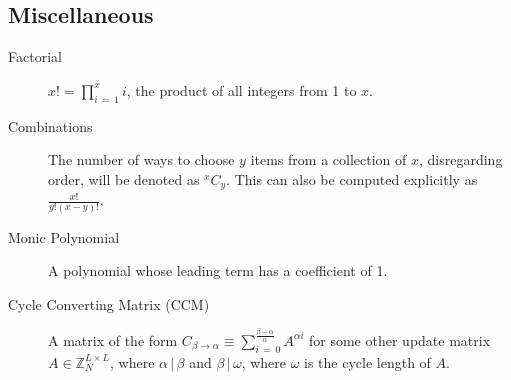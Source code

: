 \documentclass[a4paper, reqno, 12pt]{amsart}
\newcommand\combine[2]{{}^{#1}C_{#2}}
\begin{document}
		\subsection{Miscellaneous}
			\begin{description}
				\item[Factorial] $x! = \prod_{i \, = \, 1}^{x} i$, the product of all integers from 1 to $x$.
			
				\item[Combinations] The number of ways to choose $y$ items from a collection of $x$, disregarding order, will be denoted as $\combine{x}{y}$. This can also
				be computed explicitly as $\frac{x!}{y!(x-y)!}$.
				
				\item[Monic Polynomial] A polynomial whose leading term has a coefficient of 1.
				
				\item[Cycle Converting Matrix (CCM)] A matrix of the form $C_{\beta \rightarrow \alpha} \equiv \sum_{i\,=\,0}^{\frac{\beta-\alpha}{\alpha}} A^{\alpha i}$ for
				some other update matrix $A \in \mathds{Z}_{N}^{L \times L}$, where $\alpha \, | \, \beta$ and $\beta \, | \, \omega$, where $\omega$ is the cycle length
				of $A$.
			\end{description}
			
\end{document}
